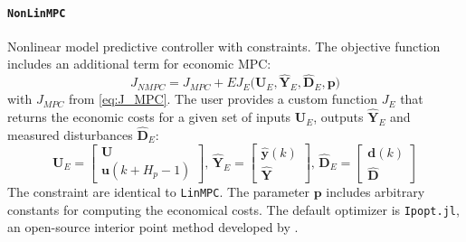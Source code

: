 \paragraph{\texttt{NonLinMPC}}
Nonlinear model predictive controller with constraints. The objective function includes an additional term for economic MPC:
\begin{equation}\label{eq:J_NMPC}
J_{\mathit{NMPC}} = J_{\mathit{MPC}} 
    + E J_E\big(\mathbf{U}_E, \mathbf{\hat{Y}}_E, \mathbf{\hat{D}}_E, \mathbf{p}\big)
\end{equation}
with $J_{\mathit{MPC}}$ from \eqref{eq:J_MPC}. The user provides a custom function $J_E$ that returns the economic costs for a given set of inputs $\mathbf{U}_E$, outputs $\mathbf{\hat{Y}}_E$ and measured disturbances $\mathbf{\hat{D}}_E$:
\begin{equation}
\mathbf{U}_E = 
\begin{bmatrix}
    \mathbf{U} \\ \mathbf{u}(k+H_p-1)
\end{bmatrix}\!,\,
\mathbf{\hat{Y}}_E = 
\begin{bmatrix}
    \mathbf{\hat{y}}(k) \\ \mathbf{\hat{Y}}
\end{bmatrix}\!,\, 
\mathbf{\hat{D}}_E = 
\begin{bmatrix}
    \mathbf{d}(k) \\ \mathbf{\hat{D}}
\end{bmatrix} 
\end{equation} 
The constraint are identical to \texttt{LinMPC}. The parameter $\mathbf{p}$ includes arbitrary constants for computing the economical costs. The default optimizer is \texttt{Ipopt.jl}, an open-source interior point method developed by \citet{ipopt}.
